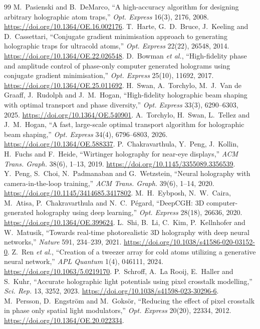 \documentclass[10pt,a4paper]{article}
\begin{document}
\begin{thebibliography}{99}
 M.~Pasienski and B.~DeMarco, ``A high-accuracy algorithm for designing arbitrary holographic atom traps,'' \emph{Opt. Express} 16(3), 2176, 2008. \url{https://doi.org/10.1364/OE.16.002176}.
 T.~Harte, G.~D.~Bruce, J.~Keeling and D.~Cassettari, ``Conjugate gradient minimisation approach to generating holographic traps for ultracold atoms,'' \emph{Opt. Express} 22(22), 26548, 2014. \url{https://doi.org/10.1364/OE.22.026548}.
 D.~Bowman \emph{et al.}, ``High-fidelity phase and amplitude control of phase-only computer generated holograms using conjugate gradient minimisation,'' \emph{Opt. Express} 25(10), 11692, 2017. \url{https://doi.org/10.1364/OE.25.011692}.
 H.~Swan, A.~Torchylo, M.~J.~Van de Graaff, J.~Rudolph and J.~M.~Hogan, ``High-fidelity holographic beam shaping with optimal transport and phase diversity,'' \emph{Opt. Express} 33(3), 6290--6303, 2025. \url{https://doi.org/10.1364/OE.540901}.
 A.~Torchylo, H.~Swan, L.~Tellez and J.~M.~Hogan, ``A fast, large-scale optimal transport algorithm for holographic beam shaping,'' \emph{Opt. Express} 34(4), 6796--6803, 2026. \url{https://doi.org/10.1364/OE.588337}.
 P.~Chakravarthula, Y.~Peng, J.~Kollin, H.~Fuchs and F.~Heide, ``Wirtinger holography for near-eye displays,'' \emph{ACM Trans. Graph.} 38(6), 1--13, 2019. \url{https://doi.org/10.1145/3355089.3356539}.
 Y.~Peng, S.~Choi, N.~Padmanaban and G.~Wetzstein, ``Neural holography with camera-in-the-loop training,'' \emph{ACM Trans. Graph.} 39(6), 1--14, 2020. \url{https://doi.org/10.1145/3414685.3417802}.
 M.~H.~Eybposh, N.~W.~Caira, M.~Atisa, P.~Chakravarthula and N.~C.~P\'egard, ``DeepCGH: 3D computer-generated holography using deep learning,'' \emph{Opt. Express} 28(18), 26636, 2020. \url{https://doi.org/10.1364/OE.399624}.
 L.~Shi, B.~Li, C.~Kim, P.~Kellnhofer and W.~Matusik, ``Towards real-time photorealistic 3D holography with deep neural networks,'' \emph{Nature} 591, 234--239, 2021. \url{https://doi.org/10.1038/s41586-020-03152-0}.
 Z.~Ren \emph{et al.}, ``Creation of a tweezer array for cold atoms utilizing a generative neural network,'' \emph{APL Quantum} 1(4), 046111, 2024. \url{https://doi.org/10.1063/5.0219170}.
 P.~Schroff, A.~La Rooij, E.~Haller and S.~Kuhr, ``Accurate holographic light potentials using pixel crosstalk modelling,'' \emph{Sci. Rep.} 13, 3252, 2023. \url{https://doi.org/10.1038/s41598-023-30296-6}.
 M.~Persson, D.~Engstr\"om and M.~Goks\"or, ``Reducing the effect of pixel crosstalk in phase only spatial light modulators,'' \emph{Opt. Express} 20(20), 22334, 2012. \url{https://doi.org/10.1364/OE.20.022334}.

\end{thebibliography}
\end{document}
